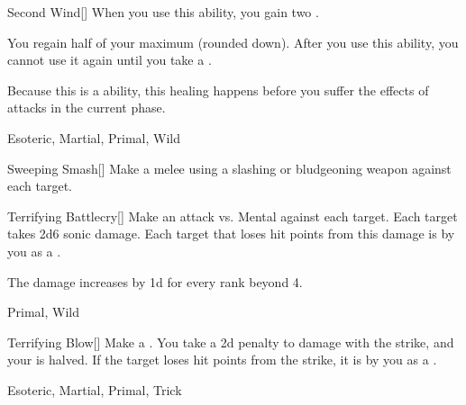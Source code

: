 \lowercase{\hypertarget{maneuver:Second Wind}{}}\label{maneuver:Second Wind}
\hypertarget{maneuver:Second Wind}{}
\begin{freeability}[Rank 4]{Second Wind}[]
When you use this ability, you gain two .

You regain half of your maximum  (rounded down).
After you use this ability, you cannot use it again until you take a .

Because this is a  ability, this healing happens before you suffer the effects of attacks in the current phase.


 Esoteric, Martial, Primal, Wild
\end{freeability}
\vspace{0.25em}



\lowercase{\hypertarget{maneuver:Sweeping Smash}{}}\label{maneuver:Sweeping Smash}
\hypertarget{maneuver:Sweeping Smash}{}
\begin{freeability}[Rank 4]{Sweeping Smash}[]
Make a melee  using a slashing or bludgeoning weapon against each target.


\end{freeability}
\vspace{0.25em}



\lowercase{\hypertarget{maneuver:Terrifying Battlecry}{}}\label{maneuver:Terrifying Battlecry}
\hypertarget{maneuver:Terrifying Battlecry}{}
\begin{freeability}[Rank 4]{Terrifying Battlecry}[]
Make an attack vs. Mental against each target.
\hit Each target takes 2d6 sonic damage.
Each target that loses hit points from this damage is  by you as a .

\rankline
The damage increases by \plus1d for every rank beyond 4.


 Primal, Wild
\end{freeability}
\vspace{0.25em}



\lowercase{\hypertarget{maneuver:Terrifying Blow}{}}\label{maneuver:Terrifying Blow}
\hypertarget{maneuver:Terrifying Blow}{}
\begin{freeability}[Rank 4]{Terrifying Blow}[]
Make a .
You take a \minus2d penalty to damage with the strike, and your  is halved.
If the target loses hit points from the strike, it is  by you as a .


 Esoteric, Martial, Primal, Trick
\end{freeability}
\vspace{0.25em}



